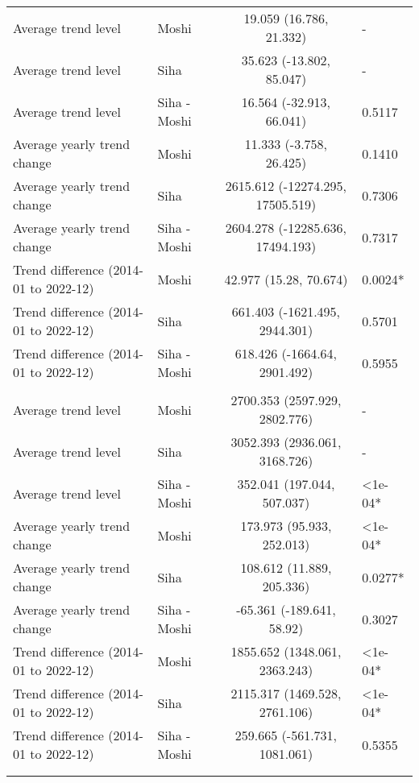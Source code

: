 \begin{longtable}{l|lcl}
\midrule\addlinespace[2.5pt]
\multicolumn{4}{l}{Typhoid} \\[2.5pt] 
\midrule\addlinespace[2.5pt]
Average trend level & Moshi & 19.059 (16.786, 21.332) & - \\ 
Average trend level & Siha & 35.623 (-13.802, 85.047) & - \\ 
Average trend level & Siha - Moshi & 16.564 (-32.913, 66.041) & 0.5117 \\ 
Average yearly trend change & Moshi & 11.333 (-3.758, 26.425) & 0.1410 \\ 
Average yearly trend change & Siha & 2615.612 (-12274.295, 17505.519) & 0.7306 \\ 
Average yearly trend change & Siha - Moshi & 2604.278 (-12285.636, 17494.193) & 0.7317 \\ 
Trend difference (2014-01 to 2022-12) & Moshi & 42.977 (15.28, 70.674) & 0.0024* \\ 
Trend difference (2014-01 to 2022-12) & Siha & 661.403 (-1621.495, 2944.301) & 0.5701 \\ 
Trend difference (2014-01 to 2022-12) & Siha - Moshi & 618.426 (-1664.64, 2901.492) & 0.5955 \\ 
\midrule\addlinespace[2.5pt]
\multicolumn{4}{l}{Upper Respiratory Infections} \\[2.5pt] 
\midrule\addlinespace[2.5pt]
Average trend level & Moshi & 2700.353 (2597.929, 2802.776) & - \\ 
Average trend level & Siha & 3052.393 (2936.061, 3168.726) & - \\ 
Average trend level & Siha - Moshi & 352.041 (197.044, 507.037) & <1e-04* \\ 
Average yearly trend change & Moshi & 173.973 (95.933, 252.013) & <1e-04* \\ 
Average yearly trend change & Siha & 108.612 (11.889, 205.336) & 0.0277* \\ 
Average yearly trend change & Siha - Moshi & -65.361 (-189.641, 58.92) & 0.3027 \\ 
Trend difference (2014-01 to 2022-12) & Moshi & 1855.652 (1348.061, 2363.243) & <1e-04* \\ 
Trend difference (2014-01 to 2022-12) & Siha & 2115.317 (1469.528, 2761.106) & <1e-04* \\ 
Trend difference (2014-01 to 2022-12) & Siha - Moshi & 259.665 (-561.731, 1081.061) & 0.5355 \\ 
\midrule\addlinespace[2.5pt]
\multicolumn{4}{l}{Urinary Tract Infections} \\[2.5pt] 
\midrule\addlinespace[2.5pt]

\end{longtable}
